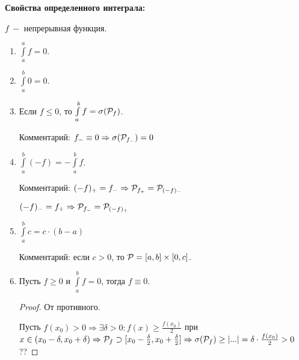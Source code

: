 \begin{statement}
    \textbf{Свойства определенного интеграла:}

    $f\ -$ непрерывная функция.

    \begin{enumerate}
        \item $\int\limits_a^a f = 0$.
        \item $\int\limits_a^b 0 = 0$.
        \item Если $f\leq 0$, то $\int\limits_a^b f = \sigma (\mathcal{P}_f)$.

        Комментарий: $f_-\equiv0\Rightarrow \sigma (\mathcal{P}_{f_-})=0$
        \item $ \int\limits_a^b (-f)=-\int\limits_a^b f$.

        Комментарий: $(-f)_+=f_-\Rightarrow \mathcal{P}_{f_+}=\mathcal{P}_{(-f)_-}$

        $(-f)_-=f_+\Rightarrow \mathcal{P}_{f_-}=\mathcal{P}_{(-f)_+}$
        \item $\int\limits_a^b c = c\cdot (b-a)$

        Комментарий: если $c>0$, то $\mathcal{P}=[a,b]\times[0,c]$.

        \item Пусть $f\geq 0$ и $\int\limits_a^b f = 0$, тогда $f\equiv 0$.
        \begin{proof}
            От противного.

            Пусть $f(x_0)>0\Rightarrow\exists \delta >0:f(x)\geq \frac{f(x_0)}{2}$ при $x\in (x_0-\delta,x_0+\delta)\Rightarrow \mathcal{P}_f\supset [x_0-\frac{\delta}{2},x_0+\frac{\delta}{2}]\Rightarrow \sigma(\mathcal{P}_f)\geq |...|=\delta\cdot \frac{f(x_0)}{2}>0$ ??
        \end{proof}
    \end{enumerate}
\end{statement}